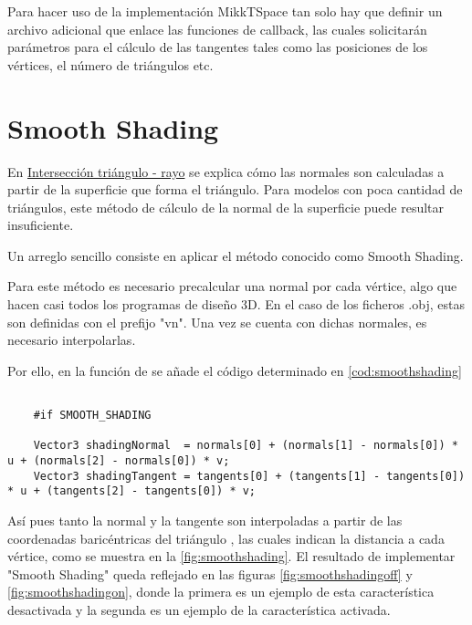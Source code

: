 Para hacer uso de la implementación MikkTSpace tan solo hay que definir un archivo adicional que enlace las funciones de callback, las cuales solicitarán parámetros para el cálculo de las tangentes tales como las posiciones de los vértices, el número de triángulos etc.

	
\section{Smooth Shading}
	
En \hyperref[subsec:triintersection]{Intersección triángulo - rayo} se explica cómo las normales son calculadas a partir de la superficie que forma el triángulo. Para modelos con poca cantidad de triángulos, este método de cálculo de la normal de la superficie puede resultar insuficiente.
	
Un arreglo sencillo consiste en aplicar el método conocido como Smooth Shading. 
	
Para este método es necesario precalcular una normal por cada vértice, algo que hacen casi todos los programas de diseño 3D. En el caso de los ficheros .obj, estas son definidas con el prefijo "vn". Una vez se cuenta con dichas normales, es necesario interpolarlas. 

Por ello, en la función  de  se añade el código determinado en \autoref{cod:smoothshading}

\begin{minipage}[c]{0.95\textwidth}
\begin{lstlisting}[label={cod:smoothshading}, caption={Código interpolación de normales}]
			
	#if SMOOTH_SHADING 

    Vector3 shadingNormal  = normals[0] + (normals[1] - normals[0]) * u + (normals[2] - normals[0]) * v;
    Vector3 shadingTangent = tangents[0] + (tangents[1] - tangents[0]) * u + (tangents[2] - tangents[0]) * v;

\end{lstlisting}
\end{minipage}
	
Así pues tanto la normal y la tangente son interpoladas a partir de las coordenadas baricéntricas del triángulo , las cuales indican la distancia a cada vértice, como se muestra en la \autoref{fig:smoothshading}. El resultado de implementar "Smooth Shading" queda reflejado en las figuras \autoref{fig:smoothshadingoff} y \autoref{fig:smoothshadingon}, donde la primera es un ejemplo de esta característica desactivada y la segunda es un ejemplo de la característica activada.
	
